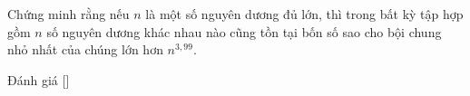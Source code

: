 \ifshowproblem
\begin{problem}\label{problem:HUN-2015-TST-KMA-633}
    Chứng minh rằng nếu \( n \) là một số nguyên dương đủ lớn,
    thì trong bất kỳ tập hợp gồm \( n \) số nguyên dương khác nhau nào cũng tồn tại bốn số sao cho bội chung nhỏ nhất của chúng lớn hơn \( n^{3{,}99} \).
\end{problem}
\fi

\ifshowinfo
Đánh giá [\textbf{}]
\fi